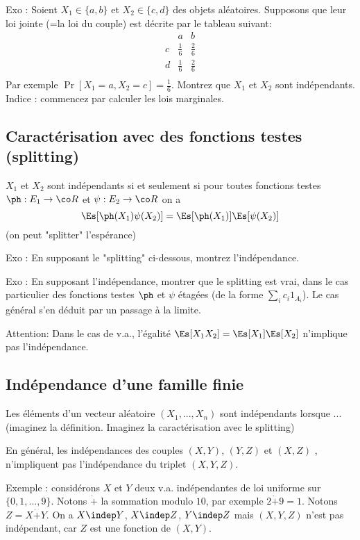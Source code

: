 \documentclass{article}
\begin{document}
Exo : Soient $X_1\in\{a,b\}$ et $X_2\in \{c,d\}$ des objets aléatoires. Supposons que leur loi jointe (=la loi du couple) est décrite par le tableau suivant:
$$
\begin{array}{c|c|c}
	& a & b  \\
	\hline
c	& \frac 16 & \frac 2 6 \\
\hline
d	& \frac 16 & \frac 2 6 \\
\end{array}
$$
Par exemple $\Pr[X_1=a,X_2=c]=\frac 16$.  Montrez que $X_1$ et $X_2$ sont indépendants.  Indice : commencez par calculer les lois marginales. 



\subsection{Caractérisation avec des fonctions testes (splitting)}

$X_1$ et $X_2$ sont indépendants si et seulement si pour toutes fonctions testes  $\ph:E_1 \to \co R$ et $\psi:E_2 \to \co R$ on a
$$
\Es[\ph(X_1) \psi(X_2)]= \Es[\ph(X_1)] \Es[\psi(X_2)]
$$
(on peut "splitter" l'espérance)

Exo : En supposant le "splitting" ci-dessous, montrez l'indépendance. 

Exo : En supposant l'indépendance, montrer que le  splitting est vrai, dans le cas particulier  des fonctions testes $\ph$ et $\psi$ étagées (de la forme $ \sum_i c_i 1_{A_i}$). Le cas général s'en déduit par un passage à la limite. 


Attention:  Dans le cas de v.a., l'égalité  $\Es[X_1 X_2] = \Es[X_1] \Es[X_2]$ n'implique pas l'indépendance. 




\subsection{Indépendance d'une famille finie}

Les éléments d'un vecteur aléatoire $(X_1,...,X_n)$ sont indépendants   lorsque ...   (imaginez la définition. Imaginez la caractérisation avec le splitting)

\vspace{2cm}


En général, les indépendances des couples $(X,Y)$, $(Y,Z)$ et $(X,Z)$ , n'impliquent pas l'indépendance du triplet $(X,Y,Z)$. 

Exemple : considérons $X$ et $Y$ deux v.a. indépendantes de loi uniforme sur $\{0,1,...,9\}$. Notons $\dot +$ la sommation modulo $10$, par exemple $2\dot + 9=1$. Notons $Z=X \dot + Y$. On a $X\indep Y$, $X\indep Z$, $Y\indep Z$ mais $(X,Y,Z)$ n'est  pas indépendant, car $Z$ est une fonction de $(X,Y)$. 
\end{document}
